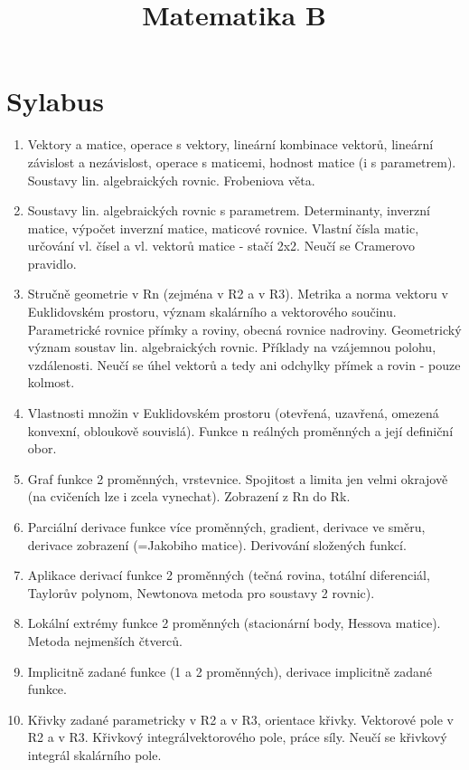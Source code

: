 \documentclass{article}
\title{Matematika B}
\theoremstyle{definition}
\begin{document}
\maketitle

\section*{Sylabus}
\begin{enumerate}
    \item Vektory a matice, operace s vektory, lineární kombinace vektorů, lineární závislost a nezávislost, operace s maticemi, hodnost matice (i s parametrem). Soustavy lin. algebraických rovnic. Frobeniova věta.
    \item Soustavy lin. algebraických rovnic s parametrem. Determinanty, inverzní matice, výpočet inverzní matice, maticové rovnice. Vlastní čísla matic, určování vl. čísel a vl. vektorů matice - stačí 2x2. Neučí se Cramerovo pravidlo.
    \item Stručně geometrie v Rn (zejména v R2 a v R3). Metrika a norma vektoru v Euklidovském prostoru, význam skalárního a vektorového součinu. Parametrické rovnice přímky a roviny, obecná rovnice nadroviny. Geometrický význam soustav lin. algebraických rovnic. Příklady na vzájemnou polohu, vzdálenosti. Neučí se úhel vektorů a tedy ani odchylky přímek a rovin - pouze kolmost.
    \item Vlastnosti množin v Euklidovském prostoru (otevřená, uzavřená, omezená konvexní, obloukově souvislá). Funkce n reálných proměnných a její definiční obor.
    \item Graf funkce 2 proměnných, vrstevnice. Spojitost a limita jen velmi okrajově (na cvičeních lze i zcela vynechat). Zobrazení z Rn do Rk.
    \item Parciální derivace funkce více proměnných, gradient, derivace ve směru, derivace zobrazení (=Jakobiho matice). Derivování složených funkcí.
    \item Aplikace derivací funkce 2 proměnných (tečná rovina, totální diferenciál, Taylorův polynom, Newtonova metoda pro soustavy 2 rovnic).
    \item Lokální extrémy funkce 2 proměnných (stacionární body, Hessova matice). Metoda nejmenších čtverců.
    \item Implicitně zadané funkce (1 a 2 proměnných), derivace implicitně zadané funkce.
    \item Křivky zadané parametricky v R2 a v R3, orientace křivky. Vektorové pole v R2 a v R3. Křivkový integrálvektorového pole, práce síly. Neučí se křivkový integrál skalárního pole.

\end{enumerate}
\end{document}

